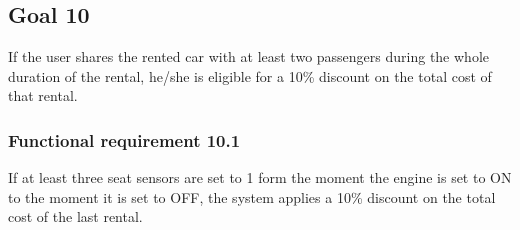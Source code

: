 \subsection{Goal 10}
If the user shares the rented car with at least two passengers during the whole duration of the rental, he/she is eligible for a 10\% discount on the total cost of that rental.

\setcounter{secnumdepth}{3}
\subsubsection{Functional requirement 10.1}
If at least three seat sensors are set to 1 form the moment the engine is set to ON to the moment it is set to OFF, the system applies a 10\% discount on the total cost of the last rental.